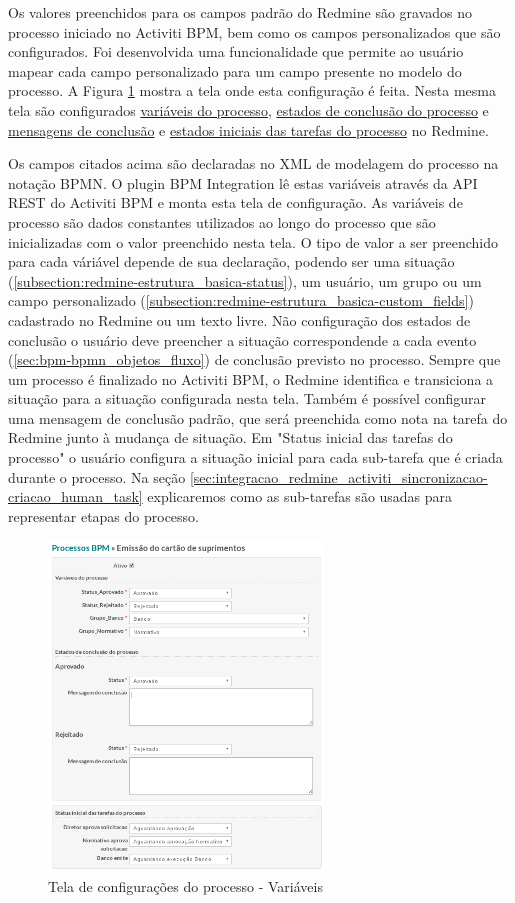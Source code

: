 Os valores preenchidos para os campos padrão do Redmine são gravados no processo iniciado no Activiti BPM, bem como os campos personalizados que são configurados. Foi desenvolvida uma funcionalidade que permite ao usuário mapear cada campo personalizado para um campo presente no modelo do processo. A Figura \ref{fig:plugin_process_settings} mostra a tela onde esta configuração é feita. Nesta mesma tela são configurados \underline{variáveis do processo},  \underline{estados de conclusão do processo} e \underline{mensagens de conclusão} e \underline{estados iniciais das tarefas do processo} no Redmine. 

Os campos citados acima são declaradas no XML de modelagem do processo na notação BPMN. O plugin BPM Integration lê estas variáveis através da API REST do Activiti BPM e monta esta tela de configuração.
As variáveis de processo são dados constantes utilizados ao longo do processo que são inicializadas com o valor preenchido nesta tela. O tipo de valor a ser preenchido para cada váriável depende de sua declaração, podendo ser uma situação (\ref{subsection:redmine-estrutura_basica-status}), um usuário, um grupo ou um campo personalizado (\ref{subsection:redmine-estrutura_basica-custom_fields}) cadastrado no Redmine ou um texto livre. Não configuração dos estados de conclusão o usuário deve preencher a situação correspondende a cada evento (\ref{sec:bpm-bpmn_objetos_fluxo}) de conclusão previsto no processo. Sempre que um processo é finalizado no Activiti BPM, o Redmine identifica e transiciona a situação para a situação configurada nesta tela. Também é possível configurar uma mensagem de conclusão padrão, que será preenchida como nota na tarefa do Redmine junto à mudança de situação. Em "Status inicial das tarefas do processo" o usuário configura a situação inicial para cada sub-tarefa que é criada durante o processo. Na seção \ref{sec:integracao_redmine_activiti_sincronizacao-criacao_human_task} explicaremos como as sub-tarefas são usadas para representar etapas do processo.

\begin{figure}[H]
\centering
\includegraphics[width=0.65\textwidth]{imagens/plugin_process_settings1.png}
\caption{Tela de configurações do processo - Variáveis}
\label{fig:plugin_process_settings}
\end{figure}

